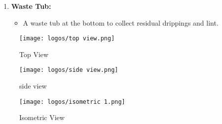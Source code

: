 \documentclass[table]{rapportCS}
\begin{document}
\begin{enumerate}[label=\arabic*.]
    \item \textbf{Waste Tub:}
    \begin{itemize}[label=$\bullet$]
        \item A waste tub at the bottom to collect residual drippings and lint.
    \end{itemize}

\end{enumerate}
\begin{figure}[h]
    \centering
    \texttt{[image: logos/top view.png]}
    \caption{Top View}
    \label{fig:outlinemindmap}
\end{figure}
\begin{figure}[h]
    \centering
    \texttt{[image: logos/side view.png]}
    \caption{side view}
    \label{fig:outlinemindmap}
\end{figure}
\begin{figure}[h]
    \centering
    \texttt{[image: logos/isometric 1.png]}
    \caption{Isometric View}
    \label{fig:outlinemindmap}
\end{figure}
\clearpage
\end{document}
